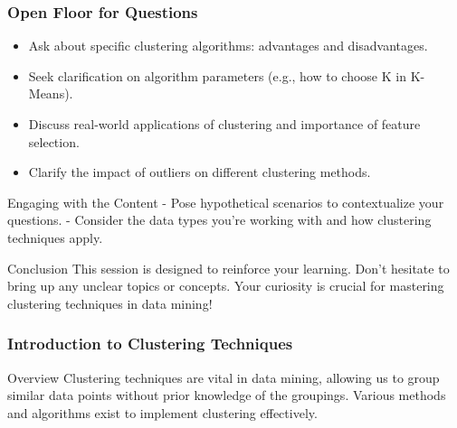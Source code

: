 \documentclass[aspectratio=169]{beamer}
\begin{document}
\begin{frame}[fragile]
    \frametitle{Open Floor for Questions}

    \begin{itemize}
        \item Ask about specific clustering algorithms: advantages and disadvantages.
        \item Seek clarification on algorithm parameters (e.g., how to choose K in K-Means).
        \item Discuss real-world applications of clustering and importance of feature selection.
        \item Clarify the impact of outliers on different clustering methods.
    \end{itemize}

    \begin{block}{Engaging with the Content}
        - Pose hypothetical scenarios to contextualize your questions.
        - Consider the data types you're working with and how clustering techniques apply.
    \end{block}

    \begin{block}{Conclusion}
        This session is designed to reinforce your learning. Don't hesitate to bring up any unclear topics or concepts. Your curiosity is crucial for mastering clustering techniques in data mining!
    \end{block}
\end{frame}

\begin{frame}[fragile]
    \frametitle{Introduction to Clustering Techniques}
    \begin{block}{Overview}
        Clustering techniques are vital in data mining, allowing us to group similar data points without prior knowledge of the groupings. Various methods and algorithms exist to implement clustering effectively.
    \end{block}
\end{frame}
\end{document}
